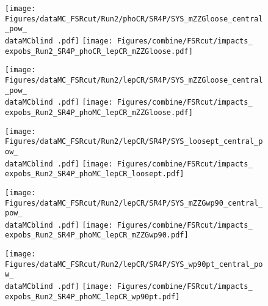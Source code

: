 \label{sec:impacts_FSRcut}

\begin{figure}
  \centering
  \texttt{[image: Figures/dataMC\_FSRcut/Run2/phoCR/SR4P/SYS\_mZZGloose\_central\_pow\_\\dataMCblind .pdf]}
  \hfill
  \texttt{[image: Figures/combine/FSRcut/impacts\_\\expobs\_Run2\_SR4P\_phoCR\_lepCR\_mZZGloose.pdf]}
  \caption{}
  \label{fig:FSRcut_cutID_phoCR_mZZGloose}
\end{figure}

\begin{figure}
  \centering
  \texttt{[image: Figures/dataMC\_FSRcut/Run2/lepCR/SR4P/SYS\_mZZGloose\_central\_pow\_\\dataMCblind .pdf]}
  \hfill
  \texttt{[image: Figures/combine/FSRcut/impacts\_\\expobs\_Run2\_SR4P\_phoMC\_lepCR\_mZZGloose.pdf]}
  \caption{}
  \label{fig:FSRcut_cutID_phoMC_mZZGloose}
\end{figure}

\begin{figure}
  \centering
  \texttt{[image: Figures/dataMC\_FSRcut/Run2/lepCR/SR4P/SYS\_loosept\_central\_pow\_\\dataMCblind .pdf]}
  \hfill
  \texttt{[image: Figures/combine/FSRcut/impacts\_\\expobs\_Run2\_SR4P\_phoMC\_lepCR\_loosept.pdf]}
  \caption{}
  \label{fig:FSRcut_cutID_phoMC_loosept}
\end{figure}

\begin{figure}
  \centering
  \texttt{[image: Figures/dataMC\_FSRcut/Run2/lepCR/SR4P/SYS\_mZZGwp90\_central\_pow\_\\dataMCblind .pdf]}
  \hfill
  \texttt{[image: Figures/combine/FSRcut/impacts\_\\expobs\_Run2\_SR4P\_phoMC\_lepCR\_mZZGwp90.pdf]}
  \caption{}
  \label{fig:FSRcut_mvaID_phoMC_mZZGwp90}
\end{figure}

\begin{figure}
  \centering
  \texttt{[image: Figures/dataMC\_FSRcut/Run2/lepCR/SR4P/SYS\_wp90pt\_central\_pow\_\\dataMCblind .pdf]}
  \hfill
  \texttt{[image: Figures/combine/FSRcut/impacts\_\\expobs\_Run2\_SR4P\_phoMC\_lepCR\_wp90pt.pdf]}
  \caption{}
  \label{fig:FSRcut_mvaID_phoMC_wp90pt}
\end{figure}

